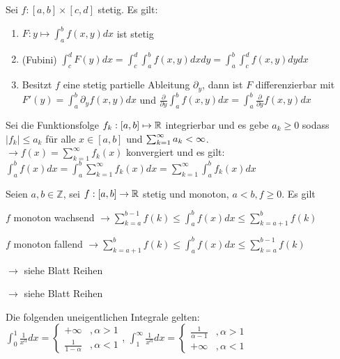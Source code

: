 \begin{satz}
	Sei $f : [a,b] \times [c,d]$ stetig. Es gilt:
	\begin{enumerate}[noitemsep]
		\item $F : y \mapsto \int_{a}^{b} f(x,y) dx$ ist stetig
		\item (Fubini) $\int_{c}^{d} F(y) dx= \int_{c}^{d} \int_{a}^{b} f(x,y) dx dy =  \int_{a}^{b} \int_{c}^{d} f(x,y) dy dx $
		\item Besitzt $f$ eine stetig partielle Ableitung $\partial_y$, dann ist $F$ differenzierbar mit $F'(y) = \int_{a}^{b} \partial_y f(x,y) dx$ und $\frac{\partial}{\partial y} \int_{a}^{b} f(x,y) dx = \int_{a}^{b} \frac{\partial}{\partial y} f(x,y) dx$ 
	\end{enumerate}
\end{satz}

\begin{satz}
	Sei die Funktionsfolge $f_k : [a,b] \mapsto \mathbb{R}$ integrierbar und es gebe $a_k \geq 0$ sodass $|f_k| \leq a_k$ für alle $x \in [a,b]$ und $\sum_{k = 1}^{\infty} a_{k} < \infty$. \\
	$\rightarrow f(x) = \sum_{k=1}^{\infty} f_k(x)$ konvergiert und es gilt: $\int_{a}^{b}f(x)dx = \int_{a}^{b} \sum_{k=1}^{\infty} f_k(x)dx =  \sum_{k=1}^{\infty} \int_{a}^{b}f_k(x) dx$
\end{satz}

\begin{satz}
	Seien $a,b \in \mathbb{Z}$, sei $f : [a,b] \rightarrow \mathbb{R}$ stetig und monoton, $a < b, f \geq 0$. Es gilt
	\begin{description}[noitemsep]
		\item $f$ monoton wachsend $\rightarrow \sum_{k=a}^{b-1} f(k) \leq \int_{a}^{b}f(x)dx \leq \sum_{k=a+1}^{b}f(k)$
		\item $f$ monoton fallend  $\rightarrow \sum_{k=a+1}^{b} f(k) \leq \int_{a}^{b}f(x)dx \leq \sum_{k=a}^{b-1}f(k)$
	\end{description}
\end{satz}

\begin{satz}
	$\rightarrow$ siehe Blatt Reihen
\end{satz}

\begin{satz}
	$\rightarrow$ siehe Blatt Reihen
\end{satz}

\begin{satz}
	Die folgenden uneigentlichen Integrale gelten: \\
	$\int_{0}^{1} \frac{1}{x^\alpha} dx = 
		\begin{cases}
			+ \infty              &, \alpha > 1 \\ 
	 		\frac{1}{1 - \alpha}  &, \alpha < 1
		\end{cases}$, 
	$\int_{1}^{\infty} \frac{1}{x^\alpha} dx = 
		\begin{cases}
			\frac{1}{\alpha - 1}  &, \alpha > 1 \\
			+ \infty              &, \alpha < 1 
		\end{cases}$
\end{satz}


